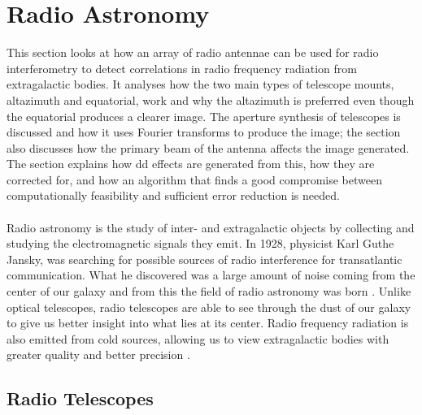 \section{Radio Astronomy}\label{ra}
This section looks at how an array of radio antennae can be used for radio interferometry to detect correlations in radio frequency radiation from extragalactic bodies. It analyses how the two main types of telescope mounts, altazimuth and equatorial, work and why the altazimuth is preferred even though the equatorial produces a clearer image. The aperture synthesis of telescopes is discussed and how it uses Fourier transforms to produce the image; the section also discusses how the primary beam of the antenna affects the image generated. The section explains how \gls{dd} effects are generated from this, how they are corrected for, and how an algorithm that finds a good compromise between computationally feasibility and sufficient error reduction is needed.
\\
\\
Radio astronomy is the study of inter- and extragalactic objects by collecting and studying the electromagnetic signals they emit. In 1928, physicist Karl Guthe Jansky, was searching for possible sources of radio interference for transatlantic communication. What he discovered was a large amount of noise coming from the center of our galaxy and from this the field of radio astronomy was born \citep{radio_intro}. Unlike optical telescopes, radio telescopes are able to see through the dust of our galaxy to give us better insight into what lies at its center. Radio frequency radiation is also emitted from cold sources, allowing us to view extragalactic bodies with greater quality and better precision \citep{radio_intro}.
\subsection{Radio Telescopes}\label{ra:sec:rt}
%
